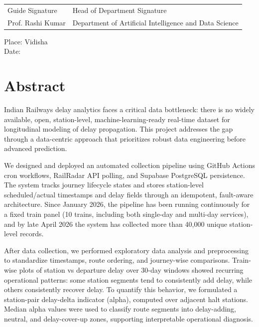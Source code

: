 \documentclass[12pt,a4paper]{report}
\newcommand{\deptname}{Department of Artificial Intelligence and Data Science}
\begin{document}
\vspace{2cm}
\begin{tabular}{>{\centering\arraybackslash}p{}>{\centering\arraybackslash}p{}}
Guide Signature & Head of Department Signature \\
Prof. Rashi Kumar & \deptname \\
\end{tabular}

\vspace{1.2cm}
\noindent Place: Vidisha\\
Date: \hrulefill

\clearpage

\chapter*{Abstract}
Indian Railways delay analytics faces a critical data bottleneck: there is no widely available, open, station-level, machine-learning-ready real-time dataset for longitudinal modeling of delay propagation. This project addresses the gap through a data-centric approach that prioritizes robust data engineering before advanced prediction.

We designed and deployed an automated collection pipeline using GitHub Actions cron workflows, RailRadar API polling, and Supabase PostgreSQL persistence. The system tracks journey lifecycle states and stores station-level scheduled/actual timestamps and delay fields through an idempotent, fault-aware architecture. Since January 2026, the pipeline has been running continuously for a fixed train panel (10 trains, including both single-day and multi-day services), and by late April 2026 the system has collected more than 40,000 unique station-level records.

After data collection, we performed exploratory data analysis and preprocessing to standardize timestamps, route ordering, and journey-wise comparisons. Train-wise plots of station vs departure delay over 30-day windows showed recurring operational patterns: some station segments tend to consistently add delay, while others consistently recover delay. To quantify this behavior, we formulated a station-pair delay-delta indicator (alpha), computed over adjacent halt stations. Median alpha values were used to classify route segments into delay-adding, neutral, and delay-cover-up zones, supporting interpretable operational diagnosis.
\end{document}
